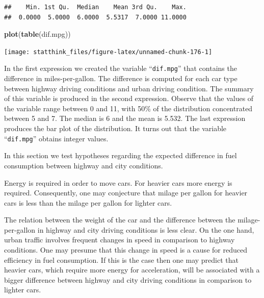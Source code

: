 \documentclass[]{krantz}
\makeatletter
\newenvironment{Shaded}{\begin{snugshade}}{\end{snugshade}}
\newcommand{\KeywordTok}[1]{\textcolor[rgb]{0.13,0.29,0.53}{\textbf{#1}}}
\newcommand{\NormalTok}[1]{#1}
\newcommand{\OperatorTok}[1]{\textcolor[rgb]{0.81,0.36,0.00}{\textbf{#1}}}
\newcommand{\StringTok}[1]{\textcolor[rgb]{0.31,0.60,0.02}{#1}}
\newenvironment{kframe}{%
\medskip{}
\setlength{\fboxsep}{.8em}
 \def\at@end@of@kframe{}%
 \ifinner\ifhmode%
  \def\at@end@of@kframe{\end{minipage}}%
  \begin{minipage}{\columnwidth}%
 \fi\fi%
 \def\FrameCommand##1{\hskip\@totalleftmargin \hskip-\fboxsep
 \colorbox{shadecolor}{##1}\hskip-\fboxsep
     \hskip-\linewidth \hskip-\@totalleftmargin \hskip\columnwidth}%
 \MakeFramed {\advance\hsize-\width
   \@totalleftmargin\z@ \linewidth\hsize
   \@setminipage}}%
 {\par\unskip\endMakeFramed%
 \at@end@of@kframe}
\renewenvironment{Shaded}{\begin{kframe}}{\end{kframe}}
\theoremstyle{definition}
\theoremstyle{definition}
\theoremstyle{definition}
\theoremstyle{remark}
\makeatother
\begin{document}
\begin{Shaded}
\end{Shaded}

\begin{verbatim}
##    Min. 1st Qu.  Median    Mean 3rd Qu.    Max. 
##  0.0000  5.0000  6.0000  5.5317  7.0000 11.0000
\end{verbatim}

\begin{Shaded}
\begin{Highlighting}[]
\KeywordTok{plot}\NormalTok{(}\KeywordTok{table}\NormalTok{(dif.mpg))}
\end{Highlighting}
\end{Shaded}

\begin{center}\texttt{[image: statthink\_files/figure-latex/unnamed-chunk-176-1]} \end{center}

In the first expression we created the variable ``\texttt{dif.mpg}'' that
contains the difference in miles-per-gallon. The difference is computed
for each car type between highway driving conditions and urban driving
condition. The summary of this variable is produced in the second
expression. Observe that the values of the variable range between 0 and
11, with 50\% of the distribution concentrated between 5 and 7. The
median is 6 and the mean is 5.532. The last expression produces the bar
plot of the distribution. It turns out that the variable ``\texttt{dif.mpg}''
obtains integer values.

In this section we test hypotheses regarding the expected difference in
fuel consumption between highway and city conditions.

Energy is required in order to move cars. For heavier cars more energy
is required. Consequently, one may conjecture that milage per gallon for
heavier cars is less than the milage per gallon for lighter cars.

The relation between the weight of the car and the difference between
the milage-per-gallon in highway and city driving conditions is less
clear. On the one hand, urban traffic involves frequent changes in speed
in comparison to highway conditions. One may presume that this change in
speed is a cause for reduced efficiency in fuel consumption. If this is
the case then one may predict that heavier cars, which require more
energy for acceleration, will be associated with a bigger difference
between highway and city driving conditions in comparison to lighter
cars.
\end{document}
